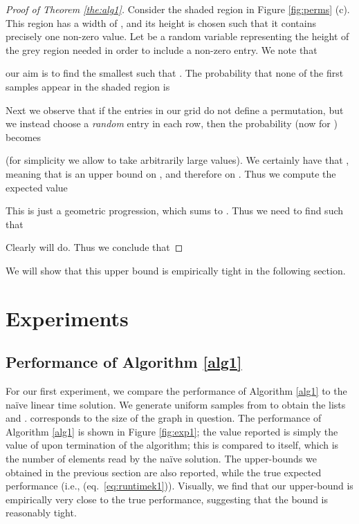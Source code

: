 \documentclass[a4paper,10pt]{article}
\newcommand{\eq}[1]{(eq.~\ref{#1})}
\begin{document}
\begin{proof}[Proof of Theorem \ref{the:alg1}]
Consider the shaded region in Figure \ref{fig:perms} (c). This region has a width of , and its height  is chosen such that it contains precisely one non-zero value. Let  be a random variable representing the height of the grey region needed in order to include a non-zero entry. We note that

our aim is to find the smallest  such that . The probability that none of the first  samples appear in the shaded region is

Next we observe that if the entries in our  grid do not define a permutation, but we instead choose a \emph{random} entry in each row, then the probability (now for ) becomes

(for simplicity we allow  to take arbitrarily large values). We certainly have that , meaning that  is an upper bound on , and therefore on . Thus we compute the expected value

This is just a geometric progression, which sums to . Thus we need to find  such that

Clearly  will do. Thus we conclude that

\end{proof}

We will show that this upper bound is empirically tight in the following section.

\section{Experiments}
\label{sec:experiments}

\subsection{Performance of Algorithm \ref{alg1}}

For our first experiment, we compare the performance of Algorithm \ref{alg1} to the na\"ive linear time solution. We generate  uniform samples from  to obtain the lists  and .  corresponds to the size of the graph in question. The performance of Algorithm \ref{alg1} is shown in Figure \ref{fig:exp1}; the value reported is simply the value of  upon termination of the algorithm; this is compared to  itself, which is the number of elements read by the na\"ive solution. The upper-bounds we obtained in the previous section are also reported, while the true expected performance (i.e., \eq{eq:runtimek1}). Visually, we find that our upper-bound is empirically very close to the true performance, suggesting that the bound is reasonably tight.
\end{document}
